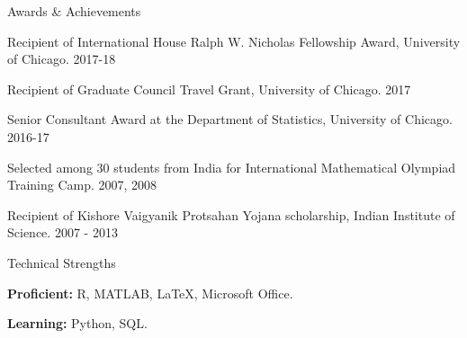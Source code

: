 \documentclass{resume} %
\begin{document}
\begin{rSection}{Awards \& Achievements}
\begin{rSubsection}{}{}{}{}
\item Recipient of International House Ralph W. Nicholas Fellowship Award, University of Chicago. \hfill {2017-18}
\item Recipient of Graduate Council Travel Grant, University of Chicago. \hfill {2017}
\item Senior Consultant Award at the Department of Statistics, University of Chicago. \hfill {2016-17}
\item Selected among 30 students from India for International Mathematical Olympiad Training Camp. \hfill {2007, 2008}
\item Recipient of Kishore Vaigyanik Protsahan Yojana scholarship, Indian Institute of Science. \hfill {2007 - 2013}
\end{rSubsection}
\end{rSection}



\begin{rSection}{Technical Strengths}
\begin{rSubsection}{}{}{}{}
\item {\bf Proficient:} R, MATLAB, \LaTeX, Microsoft Office.
\item {\bf Learning:} Python, SQL.
\end{rSubsection}
\end{rSection}
\end{document}
